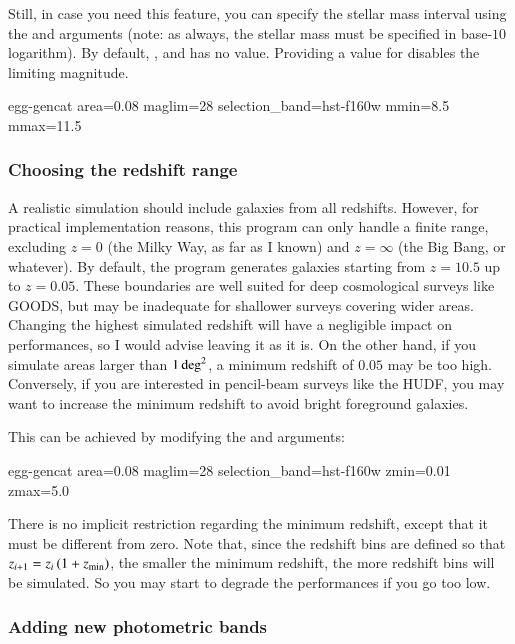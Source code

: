 Still, in case you need this feature, you can specify the stellar mass interval using the  and  arguments (note: as always, the stellar mass must be specified in base-$10$ logarithm). By default, , and  has no value. Providing a value for  disables the limiting magnitude.
\begin{bashcode}
egg-gencat area=0.08 maglim=28 selection_band=hst-f160w mmin=8.5 mmax=11.5
\end{bashcode}


\subsubsection{Choosing the redshift range}

A realistic simulation should include galaxies from all redshifts. However, for practical implementation reasons, this program can only handle a finite range, excluding $z=0$ (the Milky Way, as far as I known) and $z=\infty$ (the Big Bang, or whatever). By default, the program generates galaxies starting from $z=10.5$ up to $z=0.05$. These boundaries are well suited for deep cosmological surveys like GOODS, but may be inadequate for shallower surveys covering wider areas. Changing the highest simulated redshift will have a negligible impact on performances, so I would advise leaving it as it is. On the other hand, if you simulate areas larger than $1\,{\rm deg}^2$, a minimum redshift of $0.05$ may be too high. Conversely, if you are interested in pencil-beam surveys like the HUDF, you may want to increase the minimum redshift to avoid bright foreground galaxies.

This can be achieved by modifying the  and  arguments:
\begin{bashcode}
egg-gencat area=0.08 maglim=28 selection_band=hst-f160w zmin=0.01 zmax=5.0
\end{bashcode}

There is no implicit restriction regarding the minimum redshift, except that it must be different from zero. Note that, since the redshift bins are defined so that $z_{i+1} = z_{i}\,(1 + z_{\rm min})$, the smaller the minimum redshift, the more redshift bins will be simulated. So you may start to degrade the performances if you go too low.


\subsubsection{Adding new photometric bands}

